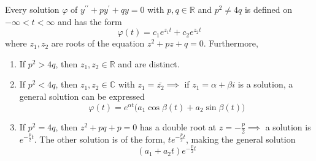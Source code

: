 \documentclass{article}
\begin{document}
      \begin{corollary}
        \label{thm:solutions-to-2nd-order-linear-deqs}
      Every solution $\varphi$ of $y^{\prime\prime} + py^\prime + q y = 0$ with $p, q \in \mathbb{R}$ and $p^2 \neq 4 q$ is defined on $-\infty < t < \infty$ and has the form 
      \begin{equation}
        \varphi(t) = c_1 e^{z_1 t} + c_2 e^{z_2 t}
      \end{equation}
      where $z_1, z_2$ are roots of the equation $z^2 + p z + q = 0$. Furthermore, 
      \begin{enumerate}
          \item If $p^2 > 4q$, then $z_1, z_2 \in \mathbb{R}$ and are distinct. 
          \item If $p^2 < 4q$, then $z_1, z_2 \in \mathbb{C}$ with $z_1 = \bar{z_2} \implies$ if $z_1 = \alpha +\beta i$ is a solution, a general solution can be expressed 
      \begin{equation}
        \varphi(t) = e^{\alpha t} \big( a_1 \cos{\beta(t)} + a_2 \sin{\beta(t)}\big)
      \end{equation}
          \item If $p^2 = 4q$, then $z^2 + p q + p = 0$ has a double root at $z = -\frac{p}{2} \implies$ a solution is $e^{- \frac{p}{2} t}$. The other solution is of the form, $t e^{- \frac{p}{2} t}$, making the general solution 
          \begin{equation}
            (a_1 + a_2 t) e^{-\frac{p}{2} t}
          \end{equation}
      \end{enumerate}
      \end{corollary}
\end{document}
